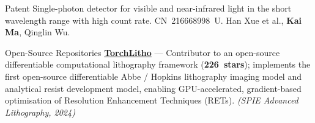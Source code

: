 \documentclass{resume}
\begin{document}
\begin{rSection}{Patent}
  Single-photon detector for visible and near-infrared light in the short wavelength
  range with high count rate.
  CN~216668998~U\@. Han Xue et al., \textbf{Kai Ma}, Qinglin Wu.
\end{rSection}

\begin{rSection}{Open-Source Repositories}
  \href{https://github.com/TorchOPC/TorchLitho}{\textbf{TorchLitho}} ---
  Contributor to an open-source differentiable computational lithography framework
  (\textbf{226~stars}); implements the first open-source differentiable Abbe / Hopkins
  lithography imaging model and analytical resist development model,
  enabling GPU-accelerated, gradient-based optimisation of Resolution Enhancement
  Techniques (RETs). \textit{(SPIE Advanced Lithography, 2024)}
\end{rSection}
\end{document}
